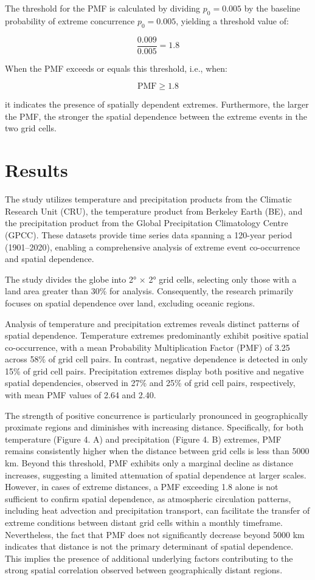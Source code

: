 \documentclass[
]{krantz}
\begin{document}
The threshold for the PMF is calculated by dividing \(p_0 = 0.005\) by the baseline probability of extreme concurrence \(p_0 = 0.005\), yielding a threshold value of:

\[
\frac{0.009}{0.005} = 1.8
\]

When the PMF exceeds or equals this threshold, i.e., when:

\[
\text{PMF} \geq 1.8
\]

it indicates the presence of spatially dependent extremes. Furthermore, the larger the PMF, the stronger the spatial dependence between the extreme events in the two grid cells.

\section{Results}\label{results-2}

The study utilizes temperature and precipitation products from the Climatic Research Unit (CRU), the temperature product from Berkeley Earth (BE), and the precipitation product from the Global Precipitation Climatology Centre (GPCC). These datasets provide time series data spanning a 120-year period (1901--2020), enabling a comprehensive analysis of extreme event co-occurrence and spatial dependence.

The study divides the globe into 2° × 2° grid cells, selecting only those with a land area greater than 30\% for analysis. Consequently, the research primarily focuses on spatial dependence over land, excluding oceanic regions.

Analysis of temperature and precipitation extremes reveals distinct patterns of spatial dependence. Temperature extremes predominantly exhibit positive spatial co-occurrence, with a mean Probability Multiplication Factor (PMF) of 3.25 across 58\% of grid cell pairs. In contrast, negative dependence is detected in only 15\% of grid cell pairs. Precipitation extremes display both positive and negative spatial dependencies, observed in 27\% and 25\% of grid cell pairs, respectively, with mean PMF values of 2.64 and 2.40.

The strength of positive concurrence is particularly pronounced in geographically proximate regions and diminishes with increasing distance. Specifically, for both temperature (Figure 4. A) and precipitation (Figure 4. B) extremes, PMF remains consistently higher when the distance between grid cells is less than 5000 km. Beyond this threshold, PMF exhibits only a marginal decline as distance increases, suggesting a limited attenuation of spatial dependence at larger scales. However, in cases of extreme distances, a PMF exceeding 1.8 alone is not sufficient to confirm spatial dependence, as atmospheric circulation patterns, including heat advection and precipitation transport, can facilitate the transfer of extreme conditions between distant grid cells within a monthly timeframe. Nevertheless, the fact that PMF does not significantly decrease beyond 5000 km indicates that distance is not the primary determinant of spatial dependence. This implies the presence of additional underlying factors contributing to the strong spatial correlation observed between geographically distant regions.
\end{document}
